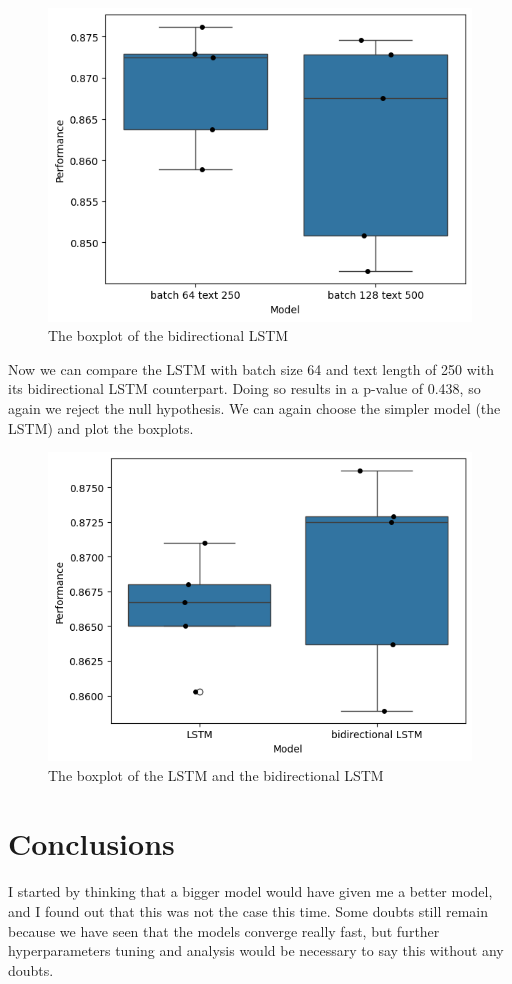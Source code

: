 \documentclass{article}
\begin{document}
\begin{figure}[htbp]
  \centering
  \includegraphics[width=0.6\linewidth]{img/boxplot_bidirectional.png}
  \caption{The boxplot of the bidirectional LSTM}
  \label{fig:bidirectional_boxplot}
\end{figure}

Now we can compare the LSTM with batch size 64 and text length of 250 with its bidirectional LSTM counterpart.
Doing so results in a p-value of 0.438, so again we reject the null hypothesis.
We can again choose the simpler model (the LSTM) and plot the boxplots.

\begin{figure}[htbp]
  \centering
  \includegraphics[width=0.6\linewidth]{img/boxplot_comparison.png}
  \caption{The boxplot of the LSTM and the bidirectional LSTM}
  \label{fig:comparison_boxplot}
\end{figure}

\section{Conclusions}

I started by thinking that a bigger model would have given me a better model, and I found out that this was not the case this time.
Some doubts still remain because we have seen that the models converge really fast, but further hyperparameters tuning and analysis would be necessary to say this without any doubts.
\end{document}
